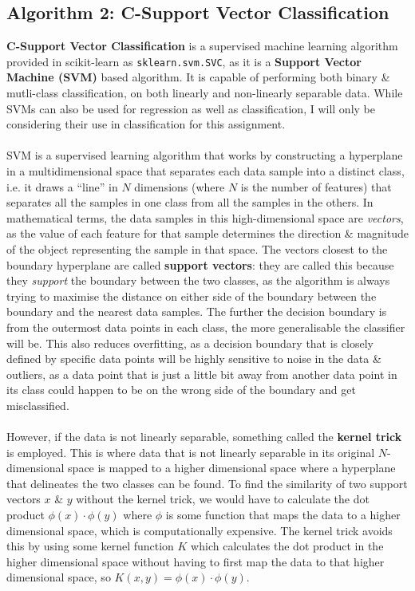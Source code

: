 \documentclass[a4paper, 10pt]{article}
\begin{document}
\subsection{Algorithm 2: C-Support Vector Classification}
\textbf{C-Support Vector Classification} is a supervised machine learning algorithm provided in scikit-learn as \texttt{sklearn.svm.SVC}, as it is a \textbf{Support Vector Machine (SVM)} based algorithm.
It is capable of performing both binary \& mutli-class classification, on both linearly and non-linearly separable data. 
While SVMs can also be used for regression as well as classification, I will only be considering their use in classification for this assignment.
\\\\
SVM is a supervised learning algorithm that works by constructing a hyperplane in a multidimensional space that separates each data sample into a distinct class, i.e. it draws a ``line'' in $N$ dimensions (where $N$ is the number of features) that separates all the samples in one class from all the samples in the others.
In mathematical terms, the data samples in this high-dimensional space are \textit{vectors}, as the value of each feature for that sample determines the direction \& magnitude of the object representing the sample in that space.
The vectors closest to the boundary hyperplane are called \textbf{support vectors}: they are called this because they \textit{support} the boundary between the two classes, as the algorithm is always trying to maximise the distance on either side of the boundary between the boundary and the nearest data samples.
The further the decision boundary is from the outermost data points in each class, the more generalisable the classifier will be.
This also reduces overfitting, as a decision boundary that is closely defined by specific data points will be highly sensitive to noise in the data \& outliers, as a data point that is just a little bit away from another data point in its class could happen to be on the wrong side of the boundary and get misclassified.
\\\\
However, if the data is not linearly separable, something called the \textbf{kernel trick} is employed.
This is where data that is not linearly separable in its original $N$-dimensional space is mapped to a higher dimensional space where a hyperplane that delineates the two classes can be found.
To find the similarity of two support vectors $x$ \& $y$ without the kernel trick, we would have to calculate the dot product $\phi(x) \cdot \phi(y)$ where $\phi$ is some function that maps the data to a higher dimensional space, which is computationally expensive.
The kernel trick avoids this by using some kernel function $K$ which calculates the dot product in the higher dimensional space without having to first map the data to that higher dimensional space, so $K(x,y) = \phi(x) \cdot \phi(y)$.
\end{document}
